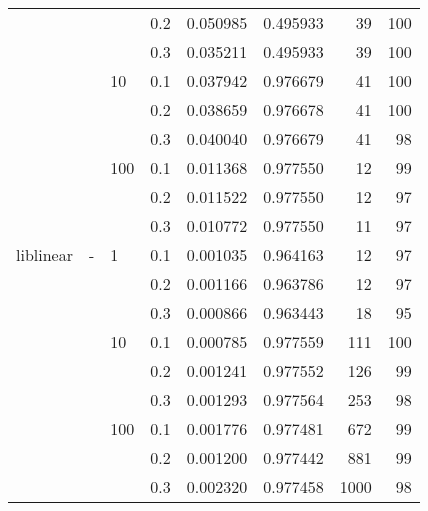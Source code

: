 \begin{table}[H]
\begin{tabular}{llllrrrr}
          &   &     & 0.2 &  0.050985 &  0.495933 &      39 &   100 \\
          &   &     & 0.3 &  0.035211 &  0.495933 &      39 &   100 \\
          &   & 10  & 0.1 &  0.037942 &  0.976679 &      41 &   100 \\
          &   &     & 0.2 &  0.038659 &  0.976678 &      41 &   100 \\
          &   &     & 0.3 &  0.040040 &  0.976679 &      41 &    98 \\
          &   & 100 & 0.1 &  0.011368 &  0.977550 &      12 &    99 \\
          &   &     & 0.2 &  0.011522 &  0.977550 &      12 &    97 \\
          &   &     & 0.3 &  0.010772 &  0.977550 &      11 &    97 \\
liblinear & - & 1   & 0.1 &  0.001035 &  0.964163 &      12 &    97 \\
          &   &     & 0.2 &  0.001166 &  0.963786 &      12 &    97 \\
          &   &     & 0.3 &  0.000866 &  0.963443 &      18 &    95 \\
          &   & 10  & 0.1 &  0.000785 &  0.977559 &     111 &   100 \\
          &   &     & 0.2 &  0.001241 &  0.977552 &     126 &    99 \\
          &   &     & 0.3 &  0.001293 &  0.977564 &     253 &    98 \\
          &   & 100 & 0.1 &  0.001776 &  0.977481 &     672 &    99 \\
          &   &     & 0.2 &  0.001200 &  0.977442 &     881 &    99 \\
          &   &     & 0.3 &  0.002320 &  0.977458 &    1000 &    98 \\
\bottomrule
\end{tabular}
\end{table}
